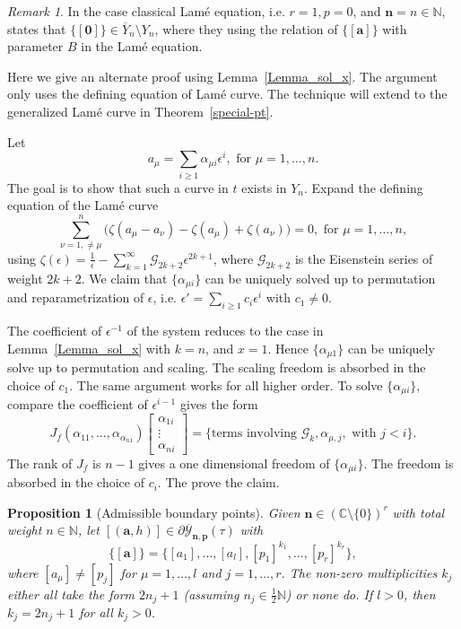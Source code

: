 \documentclass[11pt]{amsart}
\newtheorem{proposition}[theorem]{Proposition}
\theoremstyle{remark}
\newtheorem{remark}[theorem]{Remark}
\numberwithin{equation}{section}
\begin{document}
\begin{remark} \label{remark_boundary}
In the case classical Lam\'e equation, i.e. $r=1, p=0$, and $\mathbf{n} =n \in \mathbb{N}$, \cite[Theorem~7.3 (iv)]{Chai_Lin_Wang_2015} states that $\{[\mathbf{0}]\} \in \overline{Y}_n \setminus Y_n$, where they using the relation of $\{[\mathbf{a}]\}$ with parameter $B$ in the Lam\'e equation.

Here we give an alternate proof using Lemma~\ref{Lemma_sol_x}. The argument only uses the defining equation of Lam\'e curve. The technique will extend to the generalized Lam\'e curve in Theorem~\ref{special-pt}.

Let
\[
    a_\mu = \sum_{i \geq 1} \alpha_{\mu i} \epsilon^i, \text{ for }\mu = 1,\dots,n.
\]
The goal is to show that such a curve in $t$ exists in $Y_n$.
Expand the defining equation of the Lam\'e curve
\[
    \sum_{\nu=1,\neq \mu}^n \Big( \zeta(a_\mu-a_\nu) - \zeta(a_\mu) + \zeta(a_\nu) \Big) =0, \text{ for }\mu=1,\dots,n,
\]
using $\zeta(\epsilon) = \frac{1}{\epsilon} - \sum_{k=1}^{\infty} \mathcal{G}_{2k+2} \epsilon^{2k+1}$, where $\mathcal{G}_{2k+2}$ is the Eisenstein series of weight $2k+2$. We claim that $\{ \alpha_{\mu i} \}$ can be uniquely solved up to permutation and reparametrization of $\epsilon$, i.e. $\epsilon' = \sum_{i \geq 1} c_i \epsilon^i$ with $c_1 \neq 0$. 

The coefficient of $\epsilon^{-1}$ of the system reduces to the case in Lemma~\ref{Lemma_sol_x} with $k=n$, and $x = 1$. Hence $\{ \alpha_{\mu 1} \}$ can be uniquely solve up to permutation and scaling. The scaling freedom is absorbed in the choice of $c_1$. The same argument works for all higher order. To solve $\{ \alpha_{\mu i} \}$, compare the coefficient of $\epsilon^{i-1}$ gives the form
\[
    J_f( \alpha_{1 1}, \dots, \alpha_{\alpha_{n1}}) 
    \begin{bmatrix}
        \alpha_{1 i}
        \\
        \vdots
        \\
        \alpha_{ni}
    \end{bmatrix} = \{ \text{terms involving } \mathcal{G}_k, \alpha_{\mu,j}, \text{ with } j < i\}.
\]
The rank of $J_f$ is $n-1$ gives a one dimensional freedom of $\{\alpha_{\mu i}\}$. The freedom is absorbed in  the choice of $c_i$. The prove the claim. 
\end{remark}

\begin{proposition}[Admissible boundary points] \label{prop_no_mixed}
Given $\mathbf{n} \in (\mathbb{C} \setminus \{0\} )^r$ with total weight $n\in \mathbb{N}$, let $[(\mathbf{a},h)] \in  \partial\overline{\mathcal{Y}}_{\mathbf{n},\mathbf{p}}(\tau)$ with 
\[
    \{[\mathbf{a}]\} = \{[a_1], \dots, [a_l], [p_1]^{k_1}, \dots, [p_r]^{k_r}\}, 
\]
where $[a_\mu] \neq [p_j]$ for $\mu=1,\dots,l$ and $j=1,\dots,r$. The non-zero multiplicities $k_j$ either all take the form $2n_j+1$ (assuming $n_j \in \frac{1}{2}\mathbb{N}$) or none do. If $l>0$, then $k_j = 2n_j+1$ for all $k_j > 0$.  
\end{proposition}
\end{document}

